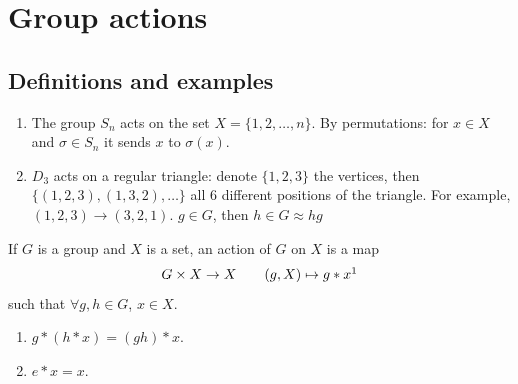 \documentclass[10pt, a4paper]{article}
\begin{document}
\newpage

\section{Group actions}

\subsection{Definitions and examples}

\begin{example}
    \begin{enumerate}[label = (\alph*)]
        \item
        The group $S_n$ acts on the set $X = \{1, 2, \dotsc, n\}$.
        By permutations:
        for $x \in X$ and $\sigma \in S_n$ it sends $x$ to $\sigma(x)$.

        \item $D_3$ acts on a regular triangle:
        denote $\{1, 2, 3\}$ the vertices,
        then $\{(1, 2, 3), (1, 3, 2), \dotsc\}$ all $6$ different positions of the triangle.
        For example,
        $(1, 2, 3) \to (3, 2, 1)$.
        $g \in G$,
        then $h \in G \approx hg$
    \end{enumerate}
\end{example}

\begin{definition}
    If $G$ is a group and $X$ is a set,
    an action of $G$ on $X$ is a map
    \[
    G \times X \to X\qquad (g, X) \mapsto g * x\footnotemark
    \]
    such that $\forall g, h \in G$,
    $x \in X$.

    \begin{enumerate}[label = (\roman*)]
        \item $g * (h * x) = (gh) * x$.

        \item $e * x = x$.
    \end{enumerate}
\end{definition}
\end{document}
